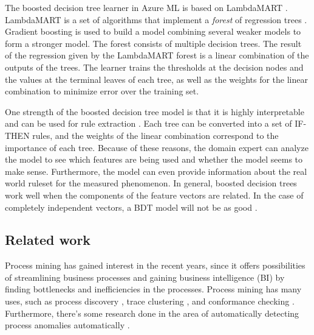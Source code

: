 The boosted decision tree learner in Azure ML is based on LambdaMART \cite{azurebdt}.
LambdaMART is a set of algorithms that implement a \textit{forest} of regression trees \cite{lambdamart2010}.
Gradient boosting  is used to build a model combining several weaker models to form a stronger model.
The forest consists of multiple decision trees.
The result of the regression given by the LambdaMART forest is a linear combination of the outputs of the trees.
The learner trains the thresholds at the decision nodes and the values at the terminal leaves of each tree, as well as the weights for the linear combination to minimize error over the training set.


One strength of the boosted decision tree model is that it is highly interpretable and can be used for rule extraction \cite{alpaydin}. Each tree can be converted into a set of IF-THEN rules, and the weights of the linear combination correspond to the importance of each tree. 
Because of these reasons, the domain expert can analyze the model to see which features are being used and whether the model seems to make sense.
Furthermore, the model can even provide information about the real world ruleset for the measured phenomenon.
In general, boosted decision trees work well when the components of the feature vectors are related. In the case of completely independent vectors, a BDT model will not be as good \cite{azurebdt}.


\subsection{Related work}
\label{sec:relatedwork}

Process mining has gained interest in the recent years, since it offers possibilities of streamlining business processes and gaining business intelligence (BI) by finding bottlenecks and inefficiencies in the processes.
Process mining has many uses, such as process discovery \cite{van2016discovery, van2013discovering}, trace clustering \cite{de2016general}, and conformance checking \cite{chomyat2016process}. Furthermore, there's some research done in the area of automatically detecting process anomalies automatically \cite{bezerra2009anomaly}.

